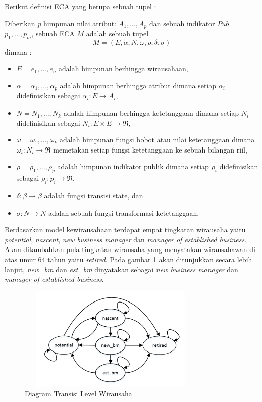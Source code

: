 \documentclass[a4paper,twoside]{article}
\begin{document}
\begin{enumerate}
\begin{enumerate}
		
		Berikut definisi ECA yang berupa sebuah tupel :
		
		Diberikan \textit{p} himpunan nilai atribut: $A_{1}, ..., A_{p}$ dan sebuah indikator $Pub$ = ${p_{1}, ..., p_{m}}$, sebuah ECA $M$ adalah sebuah tupel
\begin{displaymath}
	M = (E, \alpha, N, \omega, \rho, \delta, \sigma)
\end{displaymath}
dimana :
\begin{itemize}
	\item $E = {e_{1}, ..., e_{n}}$ adalah himpunan berhingga wirausahaan,
	\item $\alpha = {\alpha_{1}, ..., \alpha_{p}}$ adalah himpunan berhingga atribut dimana setiap $\alpha_{i}$ didefinisikan sebagai $\alpha_{i} : E \rightarrow A_{i}$,
	\item $N = {N_{1}, ..., N_{k}}$ adalah himpunan berhingga ketetanggaan dimana setiap $N_{i}$ didefinisikan sebagai $N_{i}:E \times E \rightarrow \Re$,
	\item $\omega = {\omega_{1}, ..., \omega_{k}}$ adalah himpunan fungsi bobot atau nilai ketetanggaan dimana $\omega_{i} : N_{i} \rightarrow \Re$ memetakan setiap fungsi ketetanggaan ke sebuah bilangan riil,
	\item $\rho = {\rho_{1}, ..., \rho_{p}}$ adalah himpunan indikator publik dimana setiap $\rho_{i}$ didefinisikan sebagai $\rho_{i} : p_{i} \rightarrow \Re$,
	\item $\delta : \beta \rightarrow \beta$ adalah fungsi transisi state, dan
	\item $\sigma : N \rightarrow N$ adalah sebuah fungsi transformasi ketetanggaan.
\end{itemize}

Berdasarkan model kewirausahaan terdapat empat tingkatan wirausaha yaitu \textit{potential}, \textit{nascent}, \textit{new business manager} dan \textit{manager of established business}. Akan ditambahkan pula tingkatan wirausaha yang menyatakan wirausahawan di atas umur 64 tahun yaitu \textit{retired}. Pada gambar \ref{fig:tingkatwirausaha} akan ditunjukkan secara lebih lanjut, \textit{new\_bm} dan \textit{est\_bm} dinyatakan sebagai \textit{new business manager} dan \textit{manager of established business}.


	\begin{figure} [H]
		\centering  
		\includegraphics[width=9cm, height=5cm]{tingkatwirausaha} 
		\caption[Diagram Transisi Level Wirausaha]{Diagram Transisi Level Wirausaha} 
		\label{fig:tingkatwirausaha} 
	\end{figure}
	


\end{enumerate}
\end{enumerate}
\end{document}
